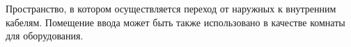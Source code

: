 Пространство, в котором осуществляется переход от 
наружных к внутренним кабелям. Помещение ввода может быть
также использовано в качестве комнаты для оборудования.